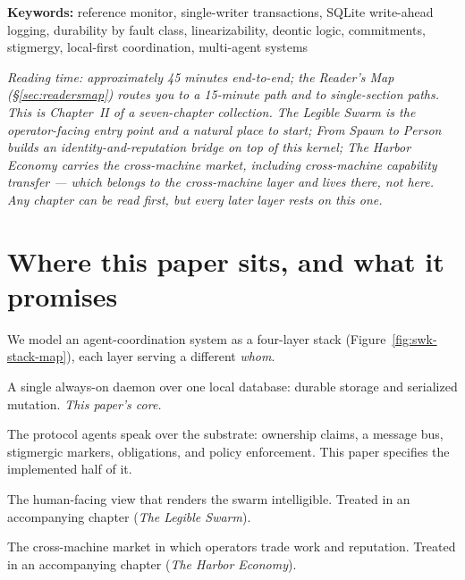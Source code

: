 \documentclass[11pt,a4paper]{article}
\theoremstyle{definition}
\theoremstyle{remark}
\begin{document}
\vspace{0.4cm}
\noindent\textbf{Keywords:} reference monitor, single-writer transactions, SQLite
write-ahead logging, durability by fault class, linearizability, deontic logic,
commitments, stigmergy, local-first coordination, multi-agent systems

\vspace{0.4cm}
\noindent\textit{Reading time: approximately 45 minutes end-to-end; the Reader's
Map (\S\ref{sec:readersmap}) routes you to a 15-minute path and to single-section
paths. This is Chapter~II of a seven-chapter collection. \emph{The Legible
Swarm} is the operator-facing entry point and a natural place to start; \emph{From
Spawn to Person} builds an identity-and-reputation bridge on top of this kernel;
\emph{The Harbor Economy} carries the cross-machine market, including
cross-machine capability transfer --- which belongs to the cross-machine layer and
lives there, not here. Any chapter can be read first, but every later layer rests on
this one.}

\tableofcontents
\newpage

\section{Where this paper sits, and what it promises}



We model an agent-coordination system as a four-layer stack
(Figure~\ref{fig:swk-stack-map}), each layer serving a different \emph{whom}.

\begin{description}[leftmargin=2.2em,style=nextline]
\item[Substrate (the machine).] A single always-on daemon over one local database:
durable storage and serialized mutation. \emph{This paper's core.}
\item[Coordination (the agents).] The protocol agents speak over the substrate:
ownership claims, a message bus, stigmergic markers, obligations, and policy
enforcement. This paper specifies the implemented half of it.
\item[Legibility (the operator).] The human-facing view that renders the swarm
intelligible. Treated in an accompanying chapter (\emph{The Legible Swarm}).
\item[Economy (the market between operators).] The cross-machine market in which
operators trade work and reputation. Treated in an accompanying chapter (\emph{The
Harbor Economy}).
\end{description}
\end{document}
